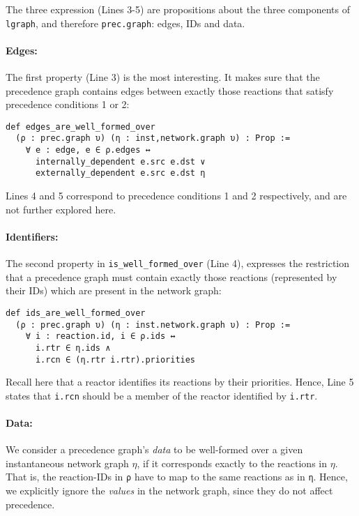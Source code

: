 \noindent The three expression (Lines 3-5) are propositions about the three components of \lstinline{lgraph}, and therefore \lstinline{prec.graph}: edges, IDs and data.

\paragraph{Edges:}

The first property (Line 3) is the most interesting.
It makes sure that the precedence graph contains edges between exactly those reactions that satisfy precedence conditions 1 or 2:

\begin{lstlisting}
def edges_are_well_formed_over 
  (ρ : prec.graph υ) (η : inst,network.graph υ) : Prop :=
    ∀ e : edge, e ∈ ρ.edges ↔ 
      internally_dependent e.src e.dst ∨
      externally_dependent e.src e.dst η
\end{lstlisting}

\noindent Lines 4 and 5 correspond to precedence conditions 1 and 2 respectively, and are not further explored here.

\paragraph{Identifiers:}

\noindent The second property in \lstinline{is_well_formed_over} (Line 4), expresses the restriction that a precedence graph must contain exactly those reactions (represented by their IDs) which are present in the network graph:

\begin{lstlisting}
def ids_are_well_formed_over 
  (ρ : prec.graph υ) (η : inst.network.graph υ) : Prop :=
    ∀ i : reaction.id, i ∈ ρ.ids ↔ 
      i.rtr ∈ η.ids ∧ 
      i.rcn ∈ (η.rtr i.rtr).priorities
\end{lstlisting}
\lstset{numbers=none, xleftmargin=0em}

\noindent Recall here that a reactor identifies its reactions by their priorities. 
Hence, Line 5 states that \lstinline{i.rcn} should be a member of the reactor identified by \lstinline{i.rtr}.

\paragraph{Data:}

We consider a precedence graph's \emph{data} to be well-formed over a given instantaneous network graph $\eta$, if it corresponds exactly to the reactions in $\eta$.
That is, the reaction-IDs in \lstinline{ρ} have to map to the same reactions as in \lstinline{η}.
Hence, we explicitly ignore the \emph{values} in the network graph, since they do not affect precedence.

